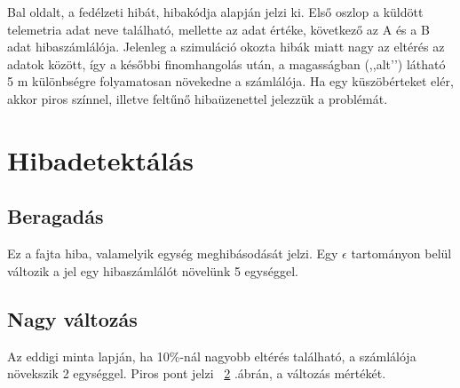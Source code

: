 \documentclass[12pt]{article}
\begin{document}
\begin{itemize}
Bal oldalt, a fedélzeti hibát, hibakódja alapján jelzi ki. Els\H{o} oszlop a küldött telemetria adat neve található, mellette az adat értéke, következ\H{o} az A és a B adat hibaszámlálója. Jelenleg a szimuláció okozta hibák miatt nagy az eltérés az adatok között, így a kés\H{o}bbi finomhangolás után, a magasságban (,,alt’’) látható 5 m különbségre folyamatosan növekedne a számlálója. Ha egy küszöbérteket elér, akkor piros színnel, illetve felt\H{u}n\H{o} hibaüzenettel jelezzük a problémát.


\section{Hibadetektálás}

\subsection{Beragadás} Ez a fajta hiba, valamelyik egység meghibásodását jelzi.  Egy $\epsilon$ tartományon belül változik a jel egy hibaszámlálót növelünk 5 egységgel.

\begin{figure}[H]
	\centering
	\caption{}
	\label{fig:hib1}
\end{figure}


\subsection{Nagy változás} Az eddigi minta lapján, ha 10\%-nál nagyobb eltérés található, a számlálója növekszik 2 egységgel. Piros pont jelzi ~\ref{fig:hib2} .ábrán, a változás mértékét.

\begin{figure}[H]
	\centering
	\caption{}
	\label{fig:hib2}
\end{figure}



\end{itemize}
\end{document}
